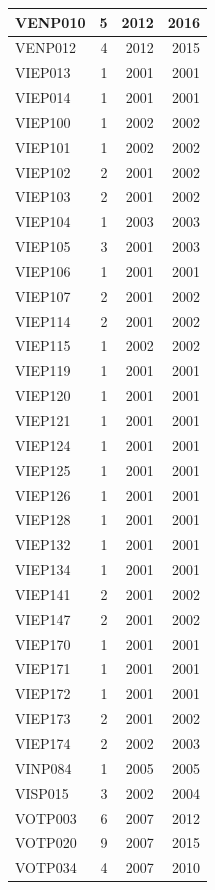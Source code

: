 \documentclass[11pt,]{book}
\begin{document}
\begin{table}
\begin{tabular}[t]{l|r|r|r}
\hline
VENP010 & 5 & 2012 & 2016\\
\hline
VENP012 & 4 & 2012 & 2015\\
\hline
VIEP013 & 1 & 2001 & 2001\\
\hline
VIEP014 & 1 & 2001 & 2001\\
\hline
VIEP100 & 1 & 2002 & 2002\\
\hline
VIEP101 & 1 & 2002 & 2002\\
\hline
VIEP102 & 2 & 2001 & 2002\\
\hline
VIEP103 & 2 & 2001 & 2002\\
\hline
VIEP104 & 1 & 2003 & 2003\\
\hline
VIEP105 & 3 & 2001 & 2003\\
\hline
VIEP106 & 1 & 2001 & 2001\\
\hline
VIEP107 & 2 & 2001 & 2002\\
\hline
VIEP114 & 2 & 2001 & 2002\\
\hline
VIEP115 & 1 & 2002 & 2002\\
\hline
VIEP119 & 1 & 2001 & 2001\\
\hline
VIEP120 & 1 & 2001 & 2001\\
\hline
VIEP121 & 1 & 2001 & 2001\\
\hline
VIEP124 & 1 & 2001 & 2001\\
\hline
VIEP125 & 1 & 2001 & 2001\\
\hline
VIEP126 & 1 & 2001 & 2001\\
\hline
VIEP128 & 1 & 2001 & 2001\\
\hline
VIEP132 & 1 & 2001 & 2001\\
\hline
VIEP134 & 1 & 2001 & 2001\\
\hline
VIEP141 & 2 & 2001 & 2002\\
\hline
VIEP147 & 2 & 2001 & 2002\\
\hline
VIEP170 & 1 & 2001 & 2001\\
\hline
VIEP171 & 1 & 2001 & 2001\\
\hline
VIEP172 & 1 & 2001 & 2001\\
\hline
VIEP173 & 2 & 2001 & 2002\\
\hline
VIEP174 & 2 & 2002 & 2003\\
\hline
VINP084 & 1 & 2005 & 2005\\
\hline
VISP015 & 3 & 2002 & 2004\\
\hline
VOTP003 & 6 & 2007 & 2012\\
\hline
VOTP020 & 9 & 2007 & 2015\\
\hline
VOTP034 & 4 & 2007 & 2010\\

\end{tabular}
\end{table}
\end{document}
